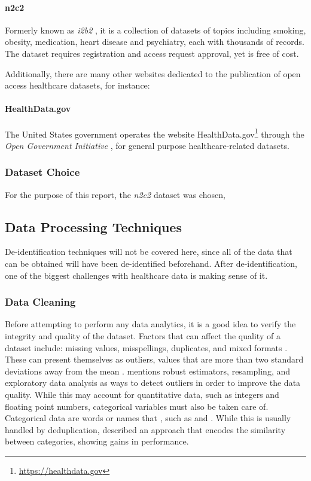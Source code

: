 \documentclass[a4paper,12pt]{article}
\begin{document}
\paragraph{n2c2} Formerly known as \textit{i2b2} , it is a collection of datasets
of topics including smoking, obesity, medication, heart disease and psychiatry,
each with thousands of records.
The dataset requires registration and access request approval, yet is free of cost.

\medskip
Additionally, there are many other websites dedicated to the publication of open
access healthcare datasets, for instance:

\paragraph{HealthData.gov} The United States government operates the website HealthData.gov\footnote{\url{https://healthdata.gov}} through the
\textit{Open Government Initiative} \parencite{Marc2015}, for general purpose
healthcare-related datasets.

\subsubsection{Dataset Choice}

For the purpose of this report, the \textit{n2c2} dataset was chosen, 


\subsection{Data Processing Techniques}

De-identification techniques will not be covered here,
since all of the data that can be obtained will have been de-identified beforehand.
After de-identification, one of the biggest challenges with healthcare data is making sense of it.

\subsubsection{Data Cleaning}

Before attempting to perform any data analytics, it is a good idea to verify the integrity and quality of the dataset. Factors that can affect the quality of a dataset include: missing values, misspellings, duplicates, and mixed formats \parencite{Chu2016}. These can present themselves as outliers, values that are more than two standard deviations away from the mean \parencite{Hellerstein2008}. \textcite{Hellerstein2008} mentions robust estimators, resampling, and exploratory data analysis as ways to detect outliers in order to improve the data quality. While this may account for quantitative data, such as integers and floating point numbers, categorical variables must also be taken care of. Categorical data are words or names that , such as  and .
While this is usually handled by deduplication, \textcite{Cerda2018} described an approach that encodes the similarity between categories, showing gains in performance.
\end{document}
